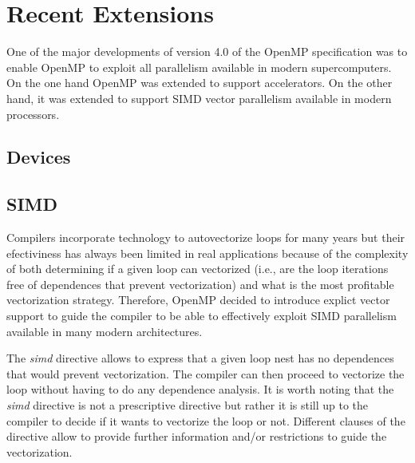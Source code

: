 \section{Recent Extensions}
\label{sec:recent_extensions}

One of the major developments of version 4.0 of the OpenMP specification was to enable OpenMP to exploit all parallelism available in modern supercomputers. On the one hand OpenMP was extended to support accelerators. On the other hand, it was extended to support SIMD vector parallelism available in modern processors. 

\subsection{Devices}
\label{sub:devices}

\subsection{SIMD}
\label{sub:simd}

Compilers incorporate technology to autovectorize loops for many years but their efectiviness has always been limited in real applications because of the complexity of both determining if a given loop can vectorized (i.e., are the loop iterations free of dependences that prevent vectorization) and what is the most profitable vectorization strategy. Therefore, OpenMP decided to introduce explict vector support to guide the compiler to be able to effectively exploit SIMD parallelism available in many modern architectures.

The \emph{simd} directive allows to express that a given loop nest has no dependences that would prevent vectorization. The compiler can then proceed to vectorize the loop without having to do any dependence analysis. It is worth noting that the \emph{simd} directive is not a prescriptive directive but rather it is still up to the compiler to decide if it wants to vectorize the loop or not. Different clauses of the directive allow to provide further information and/or restrictions to guide the vectorization.

